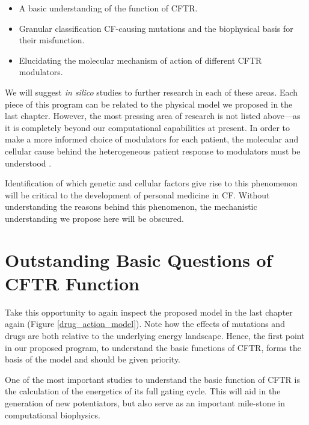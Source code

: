 \begin{itemize}
	\item A basic understanding of the function of CFTR.
	\item Granular classification CF-causing mutations and the biophysical basis for their misfunction.
	\item Elucidating the molecular mechanism of action of different CFTR modulators. 
\end{itemize}

We will suggest \textit{in silico} studies to further research in each of these areas. Each piece of this program can be related to the physical model we proposed in the last chapter. However, the most pressing area of research is not listed above---as it is completely beyond our computational capabilities at present. In order to make a more informed choice of modulators for each patient, the molecular and cellular cause behind the heterogeneous patient response to modulators must be understood \cite{hanafin2021}. 

Identification of which genetic and cellular factors give rise to this phenomenon will be critical to the development of personal medicine in CF. Without understanding the reasons behind this phenomenon, the mechanistic understanding we propose here will be obscured. 

\section{Outstanding Basic Questions of CFTR Function}

Take this opportunity to again inspect the proposed model in the last chapter again (Figure \ref{drug_action_model}). Note how the effects of mutations and drugs are both relative to the underlying energy landscape. Hence, the first point in our proposed program, to understand the basic functions of CFTR, forms the basis of the model and should be given priority.


One of the most important studies to understand the basic function of CFTR is the calculation of the energetics of its full gating cycle. This will aid in the generation of new potentiators, but also serve as an important mile-stone in computational biophysics.

